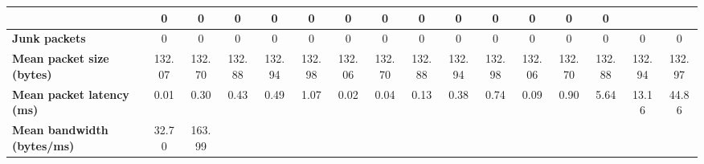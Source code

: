 \begin{table}[!h]
{\begin{tabular}{|l|ccccc|ccccc|ccccc|}
            & \multicolumn{1}{c|}{0}
            & \multicolumn{1}{c|}{0}
            & \multicolumn{1}{c|}{0}
            & \multicolumn{1}{c|}{0}
            & \multicolumn{1}{c|}{0}
            & \multicolumn{1}{c|}{0}
            & \multicolumn{1}{c|}{0}
            & \multicolumn{1}{c|}{0}
            & \multicolumn{1}{c|}{0}
            & \multicolumn{1}{c|}{0}
            & \multicolumn{1}{c|}{0}
            & \multicolumn{1}{c|}{0}
            & \multicolumn{1}{c|}{0}
            \\ \hline
            \textbf{Junk packets} & \multicolumn{1}{c|}{0} & \multicolumn{1}{c|}{0}
            & \multicolumn{1}{c|}{0}
            & \multicolumn{1}{c|}{0}
            & \multicolumn{1}{c|}{0}
            & \multicolumn{1}{c|}{0}
            & \multicolumn{1}{c|}{0}
            & \multicolumn{1}{c|}{0}
            & \multicolumn{1}{c|}{0}
            & \multicolumn{1}{c|}{0}
            & \multicolumn{1}{c|}{0}
            & \multicolumn{1}{c|}{0}
            & \multicolumn{1}{c|}{0}
            & \multicolumn{1}{c|}{0}
            & \multicolumn{1}{c|}{0}
            \\ \hline
            \textbf{Mean packet size (bytes)} & \multicolumn{1}{c|}{132.07} & \multicolumn{1}{c|}{132.70}
            & \multicolumn{1}{c|}{132.88}
            & \multicolumn{1}{c|}{132.94}
            & \multicolumn{1}{c|}{132.98}
            & \multicolumn{1}{c|}{132.06}
            & \multicolumn{1}{c|}{132.70}
            & \multicolumn{1}{c|}{132.88}
            & \multicolumn{1}{c|}{132.94}
            & \multicolumn{1}{c|}{132.98}
            & \multicolumn{1}{c|}{132.06}
            & \multicolumn{1}{c|}{132.70}
            & \multicolumn{1}{c|}{132.88}
            & \multicolumn{1}{c|}{132.94}
            & \multicolumn{1}{c|}{132.97}
            \\ \hline
            \textbf{Mean packet latency (ms)} & \multicolumn{1}{c|}{0.01} & \multicolumn{1}{c|}{0.30}
            & \multicolumn{1}{c|}{0.43}
            & \multicolumn{1}{c|}{0.49}
            & \multicolumn{1}{c|}{1.07}
            & \multicolumn{1}{c|}{0.02}
            & \multicolumn{1}{c|}{0.04}
            & \multicolumn{1}{c|}{0.13}
            & \multicolumn{1}{c|}{0.38}
            & \multicolumn{1}{c|}{0.74}
            & \multicolumn{1}{c|}{0.09}
            & \multicolumn{1}{c|}{0.90}
            & \multicolumn{1}{c|}{5.64}
            & \multicolumn{1}{c|}{13.16}
            & \multicolumn{1}{c|}{44.86}
            \\ \hline
            \textbf{Mean bandwidth (bytes/ms)} & \multicolumn{1}{c|}{32.70} & \multicolumn{1}{c|}{163.99}

\end{tabular}}
\end{table}
